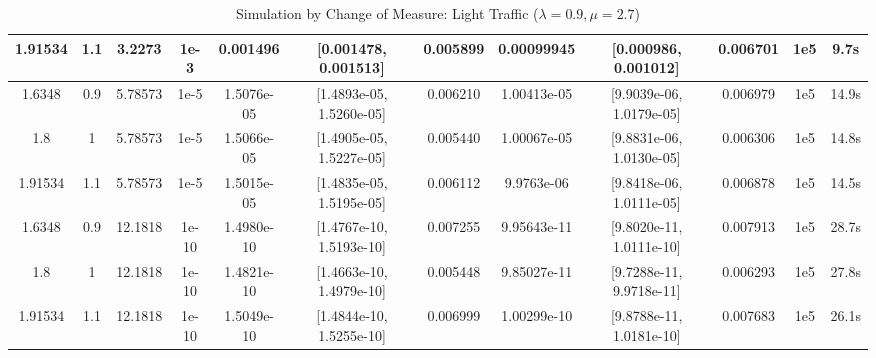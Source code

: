 \documentclass{article}
\begin{document}
\begin{table}[!htbp]
\begin{tabularx}{1.07\textwidth}{cccccccccccc}
        \midrule
        1.91534
        & 1.1
        & 3.2273
		& 1e-3
		& 0.001496
		& [0.001478, 0.001513]
		& 0.005899
		& 0.00099945
		& [0.000986, 0.001012]
		& 0.006701
		& 1e5
		& 9.7s
        \\
		\midrule
        1.6348
        & 0.9
        & 5.78573
		& 1e-5
		& 1.5076e-05
		& [1.4893e-05, 1.5260e-05]
		& 0.006210
		& 1.00413e-05
		& [9.9039e-06, 1.0179e-05]
		& 0.006979
		& 1e5
		& 14.9s
        \\
		\midrule
        1.8
        & 1
        & 5.78573
		& 1e-5
		& 1.5066e-05
		& [1.4905e-05, 1.5227e-05]
		& 0.005440
		& 1.00067e-05
		& [9.8831e-06, 1.0130e-05]
		& 0.006306
		& 1e5
		& 14.8s
        \\
		\midrule
        1.91534
        & 1.1
        & 5.78573
		& 1e-5
		& 1.5015e-05
		& [1.4835e-05, 1.5195e-05]
		& 0.006112
		& 9.9763e-06
		& [9.8418e-06, 1.0111e-05]
		& 0.006878
		& 1e5
		& 14.5s
        \\
		\midrule
        1.6348
        & 0.9
        & 12.1818
		& 1e-10
		& 1.4980e-10
		& [1.4767e-10, 1.5193e-10]
		& 0.007255
		& 9.95643e-11
		& [9.8020e-11, 1.0111e-10]
		& 0.007913
		& 1e5
		& 28.7s
        \\
		\midrule
        1.8
        & 1
        & 12.1818
		& 1e-10
		& 1.4821e-10
		& [1.4663e-10, 1.4979e-10]
		& 0.005448
		& 9.85027e-11
		& [9.7288e-11, 9.9718e-11]
		& 0.006293
		& 1e5
		& 27.8s
        \\
		\midrule
        1.91534
        & 1.1
        & 12.1818
		& 1e-10
		& 1.5049e-10
		& [1.4844e-10, 1.5255e-10]
		& 0.006999
		& 1.00299e-10
		& [9.8788e-11, 1.0181e-10]
		& 0.007683
		& 1e5
		& 26.1s
        \\
		\bottomrule
	\end{tabularx}%
	\label{tab:tab4}%
	\caption{Simulation by Change of Measure: Light Traffic ($\lambda = 0.9, \mu = 2.7$)}
\end{table}%
\end{document}
